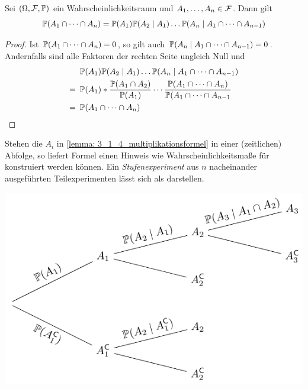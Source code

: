 \begin{lemma}[Multiplikationsformel] \label{lemma: 3_1_4_multiplikationsformel}
	Sei $(\Omega, \F, \P)$ ein Wahrscheinlichkeitsraum und $A_1, \dots, A_n \in \F$. Dann gilt
	\begin{equation*}
	\P(A_1 \cap \dots \cap A_n) = \P(A_1) \P(A_2 \mid A_1) \dots \P(A_n \mid A_1 \cap \dots \cap A_{n-1})
	\end{equation*}
\end{lemma}
\begin{proof}
	Ist $\P(A_1 \cap \dots \cap A_n) = 0$, so gilt auch $\P(A_n \mid A_1 \cap \dots \cap A_{n-1}) = 0$. Andernfalls sind alle Faktoren der rechten Seite ungleich Null und
	\begin{equation*}
	\begin{aligned}
		&\P(A_1) \P(A_2 \mid A_1) \dots \P(A_n \mid A_1 \cap \dots \cap A_{n-1}) \\
		= \enskip &\P(A_1) * \frac{\P(A_1 \cap A_2)}{\P(A_1)} \cdots \frac{\P(A_1 \cap \dots \cap A_n)}{\P(A_1 \cap \dots \cap A_{n-1}} \\
		= \enskip &\P(A_1 \cap \dots \cap A_n)
	\end{aligned}	
	\end{equation*}
\end{proof}

Stehen die $A_i$ in \cref{lemma: 3_1_4_multiplikationsformel} in einer (zeitlichen) Abfolge, so liefert Formel einen Hinweis wie Wahrscheinlichkeitsmaße für  konstruiert werden können. Ein \emph{Stufenexperiment} aus $n$ nacheinander ausgeführten Teilexperimenten lässt sich als  darstellen.

\begin{center}
	\includegraphics{./stoch_abbildungen/baum_1.pdf}
\end{center}

